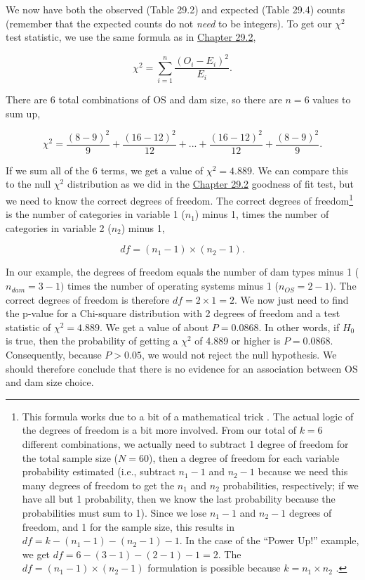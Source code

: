 \documentclass[
  openany]{krantz}
\begin{document}
We now have both the observed (Table 29.2) and expected (Table 29.4) counts (remember that the expected counts do not \emph{need} to be integers).
To get our \(\chi^{2}\) test statistic, we use the same formula as in \protect\hyperlink{chi-squared-goodness-of-fit}{Chapter 29.2},

\[\chi^{2} = \sum_{i = 1}^{n} \frac{\left(O_{i} - E_{i}\right)^{2}}{E_{i}}.\]

There are 6 total combinations of OS and dam size, so there are \(n = 6\) values to sum up,

\[\chi^{2} = \frac{(8-9)^2}{9} + \frac{(16 - 12)^{2}}{12} + ... + \frac{(16 - 12)^{2}}{12} + \frac{(8-9)^2}{9}.\]

If we sum all of the 6 terms, we get a value of \(\chi^{2} = 4.889\).
We can compare this to the null \(\chi^{2}\) distribution as we did in the \protect\hyperlink{chi-squared-goodness-of-fit}{Chapter 29.2} goodness of fit test, but we need to know the correct degrees of freedom.
The correct degrees of freedom\footnote{This formula works due to a bit of a mathematical trick \citep{Sokal1995}. The actual logic of the degrees of freedom is a bit more involved. From our total of \(k = 6\) different combinations, we actually need to subtract 1 degree of freedom for the total sample size (\(N = 60\)), then a degree of freedom for each variable probability estimated (i.e., subtract \(n_{1} - 1\) and \(n_{2} - 1\) because we need this many degrees of freedom to get the \(n_{1}\) and \(n_{2}\) probabilities, respectively; if we have all but 1 probability, then we know the last probability because the probabilities must sum to 1). Since we lose \(n_{1} - 1\) and \(n_{2} - 1\) degrees of freedom, and 1 for the sample size, this results in \(df = k - (n_{1} - 1) - (n_{2} - 1) - 1\). In the case of the ``Power Up!'' example, we get \(df = 6 - (3 - 1) - (2 - 1) - 1 = 2\). The \(df = (n_{1} - 1) \times (n_{2} - 1)\) formulation is possible because \(k = n_{1} \times n_{2}\) \citep{Sokal1995}.} is the number of categories in variable 1 (\(n_{1}\)) minus 1, times the number of categories in variable 2 (\(n_{2}\)) minus 1,

\[df = (n_{1} - 1) \times (n_{2} - 1).\]

In our example, the degrees of freedom equals the number of dam types minus 1 (\(n_{dam} = 3 - 1)\) times the number of operating systems minus 1 (\(n_{OS} = 2 - 1\)).
The correct degrees of freedom is therefore \(df = 2 \times 1 = 2\).
We now just need to find the p-value for a Chi-square distribution with 2 degrees of freedom and a test statistic of \(\chi^{2} = 4.889\).
We get a value of about \(P = 0.0868\).
In other words, if \(H_{0}\) is true, then the probability of getting a \(\chi^{2}\) of 4.889 or higher is \(P = 0.0868\).
Consequently, because \(P > 0.05\), we would not reject the null hypothesis.
We should therefore conclude that there is no evidence for an association between OS and dam size choice.
\end{document}
